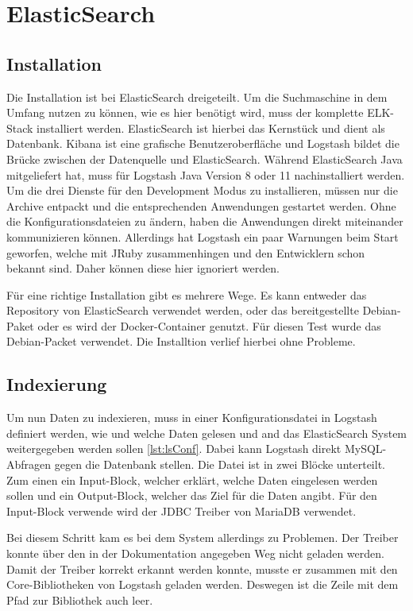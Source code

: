 
\section{ElasticSearch}

\subsection{Installation}

Die Installation ist bei ElasticSearch dreigeteilt. Um die Suchmaschine in dem Umfang nutzen zu können, wie es hier benötigt wird, muss der komplette ELK-Stack installiert werden. ElasticSearch ist hierbei das Kernstück und dient als Datenbank. Kibana ist eine grafische Benutzeroberfläche und Logstash bildet die Brücke zwischen der Datenquelle und ElasticSearch. Während ElasticSearch Java mitgeliefert hat, muss für Logstash Java Version 8 oder 11 nachinstalliert werden. Um die drei Dienste für den Development Modus zu installieren, müssen nur die Archive entpackt und die entsprechenden Anwendungen gestartet werden. Ohne die Konfigurationsdateien zu ändern, haben die Anwendungen direkt miteinander kommunizieren können. Allerdings hat Logstash ein paar Warnungen beim Start geworfen, welche mit JRuby zusammenhingen und den Entwicklern schon bekannt sind. Daher können diese hier ignoriert werden.

Für eine richtige Installation gibt es mehrere Wege. Es kann entweder das Repository von ElasticSearch verwendet werden, oder das bereitgestellte Debian-Paket oder es wird der Docker-Container genutzt. Für diesen Test wurde das Debian-Packet verwendet. Die Installtion verlief hierbei ohne Probleme.

\subsection{Indexierung}
\label{elaVgl:index}

Um nun Daten zu indexieren, muss in einer Konfigurationsdatei in Logstash definiert werden, wie und welche Daten gelesen und and das ElasticSearch System weitergegeben werden sollen \ref{lst:lsConf}. Dabei kann Logstash direkt MySQL-Abfragen gegen die Datenbank stellen. Die Datei ist in zwei Blöcke unterteilt. Zum einen ein Input-Block, welcher erklärt, welche Daten eingelesen werden sollen und ein Output-Block, welcher das Ziel für die Daten angibt. Für den Input-Block verwende wird der JDBC Treiber von MariaDB verwendet.

Bei diesem Schritt kam es bei dem System allerdings zu Problemen. Der Treiber konnte über den in der Dokumentation angegeben Weg nicht geladen werden. Damit der Treiber korrekt erkannt werden konnte, musste er zusammen mit den Core-Bibliotheken von Logstash geladen werden. Deswegen ist die Zeile mit dem Pfad zur Bibliothek auch leer. 

